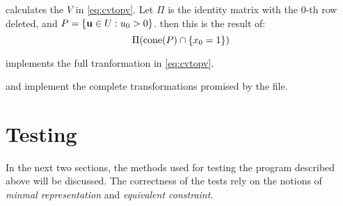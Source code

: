  calculates the $V$ in \eqref{eq:cvtopv}.  Let $\Pi$ is the identity matrix with the $0$-th row deleted, and $P = \left\{\mathbf{u} \in U : u_0 > 0\right\}$. then this is the result of:
  \[ \Pi(\operatorname{cone}(P) \cap \left\{x_0 = 1\right\}) \]
\lstnormalizedP

 implements the full tranformation in \eqref{eq:cvtopv}.
\lstvconetovpoly

 and  implement the complete transformations promised by the file.
\lsthpolytovpoly
\lstvpolytohpoly

\section{Testing}

In the next two sections, the methods used for testing the program described above will be discussed.  The correctness of the tests rely on the notions of \textit{minmal representation} and \textit{equivalent constraint}.

\subsection{}


\lsthconetestcasea
\lstvconetestcasea
\lsthpolytestcaseb
\lstvpolytestcaseb

\subsection{}
\lstoperator
\lstnorm
\lstapproximatelyzeroa
\lstapproximatelyltzero
\lstapproximatelyzerob
\lstisequivalent
\lstisequal
\lsthasequivalentmember
\lsthasequalmember
\lstsubsetmodeq
\lstsubset
\lstraysatisfieda
\lstraysatisfiedb
\lstrayssatisfied
\lstvecsatisfieda
\lstvecsatisfiedb
\lstvecssatisfied
\lstequivalentconerep
\lstequivalenthpolyrep
\lstequivalentvpolyrep
\lsthconetestcaseb
\lstvconetestcaseb
\lsthpolytestcasea
\lstvpolytestcasea



